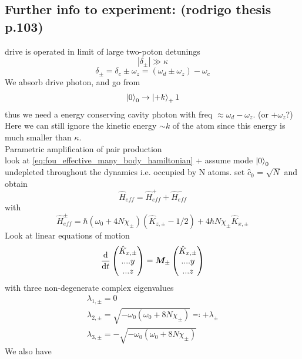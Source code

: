 \subsection{Further info to experiment: (rodrigo thesis p.103)}
drive is operated in limit of large two-poton  detunings
\begin{equation}
	|\delta_\pm| \gg \kappa
\end{equation}
\begin{equation}
	\delta_\pm = \delta_c \pm \omega_z = (\omega_d \pm \omega_z) - \omega_c
\end{equation}
We absorb drive photon, and go from 
\begin{equation}
	\ket{0}_0 \rightarrow \ket{+k}_+1
\end{equation}
thus we need a energy conserving cavity photon with freq $\approx \omega_d - \omega_z$. (or $+\omega_z$?) Here we can still ignore the kinetic energy $\sim k$ of the atom since this energy is much smaller than $\kappa$.
\\ 
Parametric amplification of pair production
\\
look at \ref{eq:fou_effective_many_body_hamiltonian} + assume mode $\ket{0}_0$ undepleted throughout the dynamics i.e. occupied by N atoms. set $\hat{c}_0$ = $\sqrt{N}$ and obtain
\begin{equation}
	\hat{H}_{eff} = \hat{H}^+_{eff} + \hat{H}^-_{eff}
\end{equation}
with 
\begin{equation}
	\hat{H}^\pm_{eff} = \hbar (\omega_0 + 4 N \chi_\pm)(\hat{K}_{z,\pm}-1/2) + 4 \hbar N \chi_\pm \hat{K}_{x,\pm}
\end{equation}
Look at linear equations of motion
\begin{equation}\label{eq:fou_time_development_linear_K}
	\frac{\mathrm{d}}{\mathrm{d}t}\left( 
	\begin{matrix}
		\hat{K}_{x,\pm}
		\\
		....y
		\\
		...z
	\end{matrix}\right) = \bm{M}_\pm 
	\left( \begin{matrix}
	\hat{K}_{x,\pm}
	\\
	....y
	\\
	...z
	\end{matrix}\right)	
\end{equation}
with three non-degenerate complex eigenvalues
\begin{align}
	\lambda_{1,\pm} = 0 
	\\
	\lambda_{2,\pm} = \sqrt{-\omega_0(\omega_0 + 8 N \chi_\pm)} \eqcolon + \lambda_\pm
	\\
	\lambda_{3,\pm} = - \sqrt{- \omega_0 (\omega_0+8N \chi_\pm)}
\end{align}
We also have


